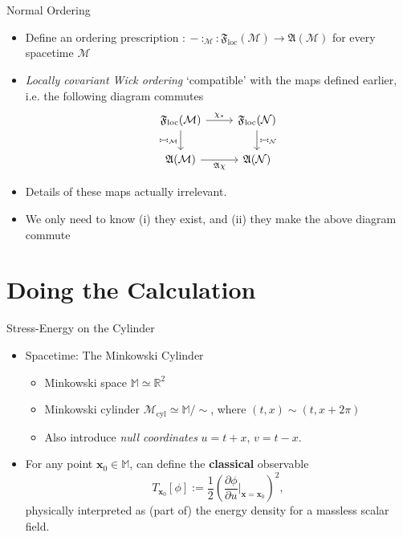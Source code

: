 \documentclass[pdf, fleqn, compress, handout]{beamer}
\newcommand{\nord}[1]{\boldsymbol{:}\!#1\!\boldsymbol{:}}
\newcommand{\mathsterm}[1]{{\itshape\color{dark-teal!80}#1}}
\begin{document}
\begin{frame}[fragile]{Normal Ordering}
	\begin{itemize}
		\item	Define an ordering prescription
				$
					\nord{-}_\mathcal{M}:
					\mathfrak{F}_\mathrm{loc}(\mathcal{M})
						\to
					\mathfrak{A}(\mathcal{M})
				$
				for every spacetime $\mathcal{M}$
		\item   \mathsterm{Locally covariant Wick ordering}
				`compatible' with the maps defined earlier,
				i.e. the following diagram commutes
				\begin{equation}
					\begin{tikzcd}
						\mathfrak{F}_\mathrm{loc}(\mathcal{M})
							\rar["\chi_*"]
							\dar[swap, "\nord{-}_\mathcal{M}"]	&
						\mathfrak{F}_\mathrm{loc}(\mathcal{N})
							\dar["\nord{-}_\mathcal{N}"]	\\
						\mathfrak{A}(\mathcal{M})
							\rar[swap, "\mathfrak{A}\chi"]	&
						\mathfrak{A}(\mathcal{N})						
					\end{tikzcd}
				\end{equation}
		\item	Details of these maps actually irrelevant.
		\item   We only need to know (i) they exist,
				and (ii) they make the above diagram commute
	\end{itemize}
\end{frame}

\section{Doing the Calculation}

\begin{frame}{Stress-Energy on the Cylinder}
	\begin{itemize}
		\item	Spacetime: The Minkowski Cylinder
		\begin{itemize}
			\item	Minkowski space $\mathbb{M} \simeq \mathbb{R}^2$
			\item	Minkowski cylinder
					$\mathcal{M}_\mathrm{cyl} \simeq \mathbb{M} / \sim$,
					where $(t, x) \sim (t, x + 2\pi)$
			\item   Also introduce \mathsterm{null coordinates} $u = t + x$, $v = t - x$.
		\end{itemize}
		\item   For any point $\mathbf{x}_0 \in \mathbb{M}$,
				can define the \textbf{classical} observable
				\begin{equation}
					T_{\mathbf{x}_0}[\phi]
						:=
					\frac{1}{2}
					\left(
						\frac{\partial \phi}{\partial u}
						\Big|_{\mathbf{x} = \mathbf{x}_0}
					\right)^2,
				\end{equation}
				physically interpreted as (part of)
				the energy density for a massless scalar field.
	\end{itemize}
\end{frame}
\end{document}
